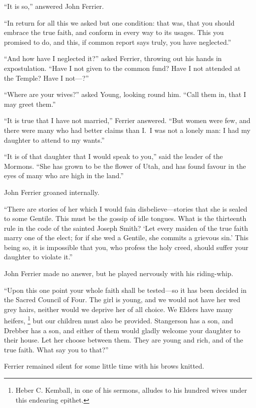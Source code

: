 \documentclass[12pt,english,oneside]{book}
\newcommand{\mdsh}[1]{\mbox{#1}\linebreak[1]}
\begin{document}
{}``It is so,'' answered John Ferrier.

{}``In return for all this we asked but one condition: that was,
that you should embrace the true faith, and conform in every way to
its usages. This you promised to do, and this, if common report says
truly, you have neglected.''

{}``And how have I neglected it?'' asked Ferrier, throwing out his
hands in expostulation. {}``Have I not given to the common fund?
Have I not attended at the Temple? Have I not\mbox{---}?''

{}``Where are your wives?'' asked Young, looking round him. {}``Call
them in, that I may greet them.''

{}``It is true that I have not married,'' Ferrier answered. {}``But
women were few, and there were many who had better claims than I.\ 
I was not a lonely man: I had my daughter to attend to my wants.''

{}``It is of that daughter that I would speak to you,'' said the
leader of the Mormons. {}``She has grown to be the flower of Utah,
and has found favour in the eyes of many who are high in the land.''

John Ferrier groaned internally.

{}``There are stories of her which I would fain disbelieve\mdsh{---}stories
that she is sealed to some Gentile. This must be the gossip of idle
tongues. What is the thirteenth rule in the code of the sainted Joseph
Smith? `Let every maiden of the true faith marry one of the elect;
for if she wed a Gentile, she commits a grievous sin.' This being
so, it is impossible that you, who profess the holy creed, should
suffer your daughter to violate it.''

John Ferrier made no answer, but he played nervously with his riding-whip.

{}``Upon this one point your whole faith shall be tested\mdsh{---}so
it has been decided in the Sacred Council of Four. The girl is young,
and we would not have her wed grey hairs, neither would we deprive
her of all choice. We Elders have many heifers,%
\footnote{Heber C. Kemball, in one of his sermons, alludes to his hundred wives
under this endearing epithet.%
} but our children must also be provided. Stangerson has a son, and
Drebber has a son, and either of them would gladly welcome your daughter
to their house. Let her choose between them. They are young and rich,
and of the true faith. What say you to that?''

Ferrier remained silent for some little time with his brows knitted.
\end{document}
